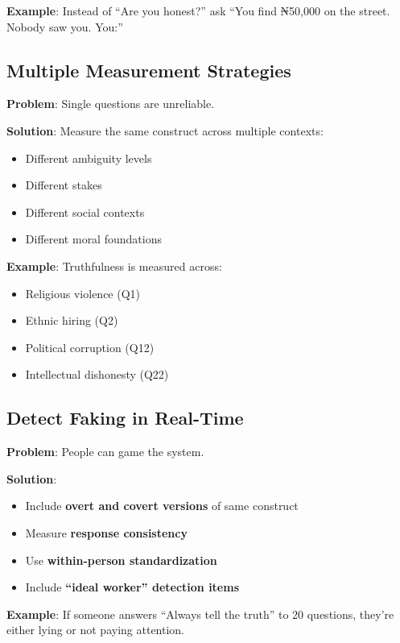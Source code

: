 \documentclass[11pt,a4paper]{article}
\begin{document}
\textbf{Example}: Instead of ``Are you honest?'' ask ``You find ₦50,000 on the street. Nobody saw you. You:''

\subsection{Multiple Measurement Strategies}

\textbf{Problem}: Single questions are unreliable.

\textbf{Solution}: Measure the same construct across multiple contexts:
\begin{itemize}[leftmargin=*]
    \item Different ambiguity levels
    \item Different stakes
    \item Different social contexts
    \item Different moral foundations
\end{itemize}

\textbf{Example}: Truthfulness is measured across:
\begin{itemize}[leftmargin=*]
    \item Religious violence (Q1)
    \item Ethnic hiring (Q2)
    \item Political corruption (Q12)
    \item Intellectual dishonesty (Q22)
\end{itemize}

\subsection{Detect Faking in Real-Time}

\textbf{Problem}: People can game the system.

\textbf{Solution}:
\begin{itemize}[leftmargin=*]
    \item Include \textbf{overt and covert versions} of same construct
    \item Measure \textbf{response consistency}
    \item Use \textbf{within-person standardization}
    \item Include \textbf{``ideal worker'' detection items}
\end{itemize}

\textbf{Example}: If someone answers ``Always tell the truth'' to 20 questions, they're either lying or not paying attention.
\end{document}
